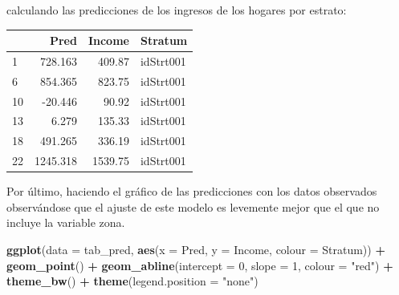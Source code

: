\documentclass[
  spanish,
  12pt,
]{book}
\newenvironment{Shaded}{\begin{snugshade}}{\end{snugshade}}
\newcommand{\AttributeTok}[1]{\textcolor[rgb]{0.13,0.29,0.53}{#1}}
\newcommand{\DataTypeTok}[1]{\textcolor[rgb]{0.13,0.29,0.53}{#1}}
\newcommand{\DecValTok}[1]{\textcolor[rgb]{0.00,0.00,0.81}{#1}}
\newcommand{\FunctionTok}[1]{\textcolor[rgb]{0.13,0.29,0.53}{\textbf{#1}}}
\newcommand{\NormalTok}[1]{#1}
\newcommand{\OtherTok}[1]{\textcolor[rgb]{0.56,0.35,0.01}{#1}}
\newcommand{\SpecialCharTok}[1]{\textcolor[rgb]{0.81,0.36,0.00}{\textbf{#1}}}
\newcommand{\StringTok}[1]{\textcolor[rgb]{0.31,0.60,0.02}{#1}}
\begin{document}
calculando las predicciones de los ingresos de los hogares por estrato:

\begin{Shaded}
\end{Shaded}

\begin{tabular}{l|r|r|l}
\hline
  & Pred & Income & Stratum\\
\hline
1 & 728.163 & 409.87 & idStrt001\\
\hline
6 & 854.365 & 823.75 & idStrt001\\
\hline
10 & -20.446 & 90.92 & idStrt001\\
\hline
13 & 6.279 & 135.33 & idStrt001\\
\hline
18 & 491.265 & 336.19 & idStrt001\\
\hline
22 & 1245.318 & 1539.75 & idStrt001\\
\hline
\end{tabular}

Por último, haciendo el gráfico de las predicciones con los datos observados observándose que el ajuste de este modelo es levemente mejor que el que no incluye la variable zona.

\begin{Shaded}
\begin{Highlighting}[]
\FunctionTok{ggplot}\NormalTok{(}\AttributeTok{data =}\NormalTok{ tab\_pred, }\FunctionTok{aes}\NormalTok{(}\AttributeTok{x =}\NormalTok{ Pred, }\AttributeTok{y =}\NormalTok{ Income, }\AttributeTok{colour =}\NormalTok{ Stratum)) }\SpecialCharTok{+} 
  \FunctionTok{geom\_point}\NormalTok{() }\SpecialCharTok{+} \FunctionTok{geom\_abline}\NormalTok{(}\AttributeTok{intercept =} \DecValTok{0}\NormalTok{, }\AttributeTok{slope =} \DecValTok{1}\NormalTok{, }\AttributeTok{colour =} \StringTok{"red"}\NormalTok{) }\SpecialCharTok{+}
  \FunctionTok{theme\_bw}\NormalTok{() }\SpecialCharTok{+} \FunctionTok{theme}\NormalTok{(}\AttributeTok{legend.position =} \StringTok{"none"}\NormalTok{) }
\end{Highlighting}
\end{Shaded}
\end{document}
